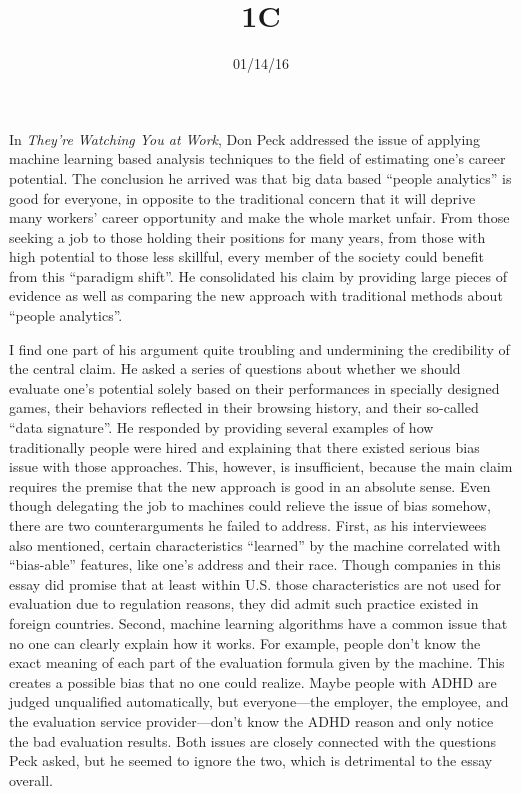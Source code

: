\documentclass{writing}
\title{1C}
\date{01/14/16}
\begin{document}
\maketitle

In \emph{They're Watching You at Work}, Don Peck addressed the issue of
applying machine learning based analysis techniques to the field of
estimating one's career potential. The conclusion he arrived was that
big data based ``people analytics'' is good for everyone, in opposite to
the traditional concern that it will deprive many workers' career
opportunity and make the whole market unfair. From those seeking a job
to those holding their positions for many years, from those with high
potential to those less skillful, every member of the society could
benefit from this ``paradigm shift''. He consolidated his claim by
providing large pieces of evidence as well as comparing the new approach
with traditional methods about ``people analytics''.

I find one part of his argument quite troubling and undermining the
credibility of the central claim. He asked a series of questions about
whether we should evaluate one's potential solely based on their
performances in specially designed games, their behaviors reflected in
their browsing history, and their so-called ``data signature''. He
responded by providing several examples of how traditionally people were
hired and explaining that there existed serious bias issue with those
approaches. This, however, is insufficient, because the main claim
requires the premise that the new approach is good in an absolute sense.
Even though delegating the job to machines could relieve the issue of
bias somehow, there are two counterarguments he failed to address.
First, as his interviewees also mentioned, certain characteristics
``learned'' by the machine correlated with ``bias-able'' features, like
one's address and their race. Though companies in this essay did promise
that at least within U.S. those characteristics are not used for
evaluation due to regulation reasons, they did admit such practice
existed in foreign countries. Second, machine learning algorithms have a
common issue that no one can clearly explain how it works. For example,
people don't know the exact meaning of each part of the evaluation
formula given by the machine. This creates a possible bias that no one
could realize. Maybe people with ADHD are judged unqualified
automatically, but everyone---the employer, the employee, and the
evaluation service provider---don't know the ADHD reason and only notice
the bad evaluation results. Both issues are closely connected with the
questions Peck asked, but he seemed to ignore the two, which is
detrimental to the essay overall.
\end{document}
